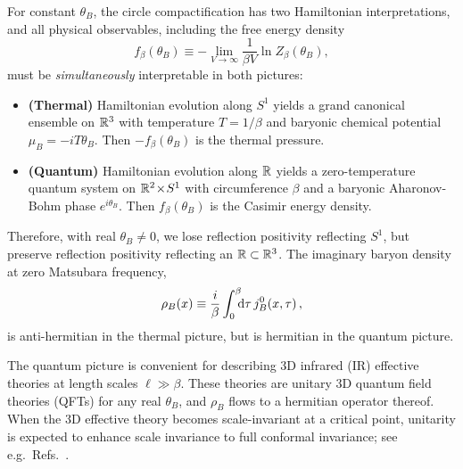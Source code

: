 \documentclass[
 reprint,







nofootinbib,


 amsmath,amssymb,
 aps,
 prd






tightenlines
]{revtex4-2}
\begin{document}
For constant $\theta_B$, the circle compactification has two Hamiltonian
interpretations, and all physical observables, including the free energy
density
\begin{equation}
    \label{eq:free_energy}
    f_{\beta}(\theta_B)\equiv-\lim_{V\to\infty}\frac{1}{\beta V}\ln Z_{\beta}(\theta_B),
\end{equation}
must be \emph{simultaneously} interpretable in both pictures:
\begin{itemize}
    \item \textbf{(Thermal)} Hamiltonian evolution along $S^1$ yields a grand
    canonical ensemble on $\mathbb{R}^3$ with temperature $T=1/\beta$ and baryonic chemical potential $\mu_B =
    -iT\theta_B$. Then $-f_{\beta}(\theta_B)$ is the thermal pressure.
    \item \textbf{(Quantum)} Hamiltonian evolution along $\mathbb{R}$ yields a
    zero-temperature quantum system on $\mathbb{R}^2\!\times\!S^1$ with
    circumference $\beta$ and a baryonic Aharonov-Bohm phase
    $e^{i\theta_B}$. Then $f_{\beta}(\theta_B)$ is the Casimir energy
    density.
\end{itemize}
Therefore, with real $\theta_B\neq0$, we lose reflection positivity
reflecting $S^1$, but preserve reflection positivity reflecting an
$\mathbb{R} \subset \mathbb{R}^3$.
The imaginary baryon density at zero Matsubara frequency,
\begin{equation}\label{eq:baryon_density}
    \rho_B(x) \equiv \frac{i}{\beta}\int_{0}^{\beta}\!\!\!\mathrm{d}\tau\, j_B^0(x,\tau)\,,
\end{equation}
is anti-hermitian in the thermal picture, but is hermitian in the quantum picture.

The quantum picture is convenient for describing 3D infrared (IR)
effective theories at length scales $\ell \gg\beta$. These theories are
unitary 3D quantum field theories (QFTs) for any real $\theta_B$, and $\rho_B$ flows to a hermitian operator thereof. When the 3D effective
theory becomes scale-invariant at a critical point,
unitarity is expected to enhance scale invariance to full conformal invariance; see
e.g.~Refs.~\cite{Polchinski:1987dy,El-Showk:2011xbs,Nakayama:2013is,Delamotte:2015aaa,Paulos:2015jfa,Meneses:2018xpu}.
\end{document}
